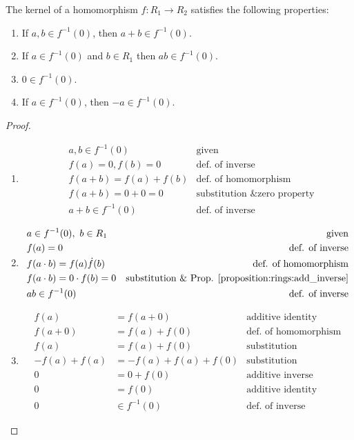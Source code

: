 \begin{prop}\label{proposition:rings:kernelIsIdeal}
The kernel of a homomorphism $f:R_1\rightarrow R_2$ satisfies the following properties:
\begin{enumerate}
\item If $a,b\in f^{-1}(0)$, then $a+b\in f^{-1}(0)$.
\item If $a\in f^{-1}(0)$ and $b\in R_1$ then $ab\in f^{-1}(0)$.
\item $0\in f^{-1}(0)$.
\item If $a\in f^{-1}(0)$, then $-a\in f^{-1}(0)$.
\end{enumerate}

\begin{proof}
\begin{enumerate}
\item
\begin{align*}
&a,b\in f^{-1}(0) & \text{given}\\
&f(a)=0,f(b)=0 & \text{def. of inverse}\\
&f(a+b)=f(a)+f(b) & \text{def. of homomorphism}\\
&f(a+b)=0+0=0 & \text{substitution \& zero property}\\
&a+b\in f^{-1}(0) & \text{def. of inverse}
\end{align*}
\item
\begin{align*}
&a\in f^{-1}(0),~b\in R_1 & \text{given}\\
&f(a)=0 & \text{def. of inverse}\\
&f(a\cdot b)=f(a)\dot f(b) & \text{def. of homomorphism}\\
&f(a\cdot b)=0\cdot f(b)=0 & \text{substitution \& Prop. \ref{proposition:rings:add_inverse}}\\
&ab\in f^{-1}(0) & \text{def. of inverse}
\end{align*}
\item
\begin{align*}
f(a)&=f(a+0) & \text{additive identity}\\
f(a+0)&=f(a)+f(0) & \text{def. of homomorphism}\\
f(a)&=f(a)+f(0) & \text{substitution}\\
-f(a)+f(a)&=-f(a)+f(a)+f(0) & \text{substitution}\\
0&=0+f(0) & \text{additive inverse}\\
0&=f(0) & \text{additive identity}\\
0&\in f^{-1}(0) & \text{def. of inverse}
\end{align*}

\end{enumerate}
\end{proof}
\end{prop}

